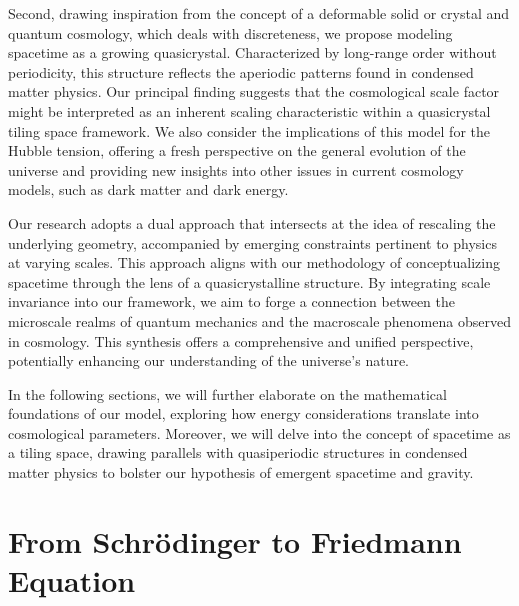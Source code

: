 \documentclass{article}
\begin{document}
Second, drawing inspiration from the concept of a deformable solid or crystal and quantum cosmology, which deals with discreteness, we propose modeling spacetime as a growing quasicrystal. Characterized by long-range order without periodicity, this structure reflects the aperiodic patterns found in condensed matter physics. Our principal finding suggests that the cosmological scale factor might be interpreted as an inherent scaling characteristic within a quasicrystal tiling space framework. We also consider the implications of this model for the Hubble tension, offering a fresh perspective on the general evolution of the universe and providing new insights into other issues in current cosmology models, such as dark matter and dark energy.

Our research adopts a dual approach that intersects at the idea of rescaling the underlying geometry, accompanied by emerging constraints pertinent to physics at varying scales. This approach aligns with our methodology of conceptualizing spacetime through the lens of a quasicrystalline structure. By integrating scale invariance into our framework, we aim to forge a connection between the microscale realms of quantum mechanics and the macroscale phenomena observed in cosmology. This synthesis offers a comprehensive and unified perspective, potentially enhancing our understanding of the universe's nature.

In the following sections, we will further elaborate on the mathematical foundations of our model, exploring how energy considerations translate into cosmological parameters. Moreover, we will delve into the concept of spacetime as a tiling space, drawing parallels with quasiperiodic structures in condensed matter physics to bolster our hypothesis of emergent spacetime and gravity.

\section{From Schr{\"o}dinger to Friedmann Equation}
\label{sec:freedmaneqwavefunction}
\end{document}
